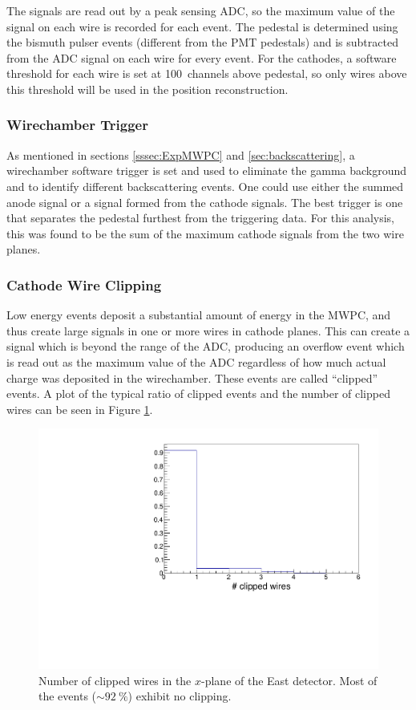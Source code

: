 The signals are read out by a peak sensing ADC, so the maximum value of the signal on each wire
is recorded
for each event. The pedestal is determined using the bismuth pulser events (different from the
PMT pedestals) and is subtracted from the ADC signal on each wire for every event. For the cathodes, a software
threshold for each wire is set at 100~channels above pedestal, so only wires above this threshold
will be used in the position reconstruction.

\subsubsection{Wirechamber Trigger} \label{sssec:mwpctrigg}

As mentioned in sections \ref{sssec:ExpMWPC} and \ref{sec:backscattering}, a wirechamber
software trigger is set and used to eliminate the gamma background and to identify different
backscattering events. One could use either the summed anode signal or a signal formed from
the cathode signals. The best trigger is one that separates the pedestal furthest from the
triggering data. For this analysis, this was found to be the sum of the maximum cathode
signals from the two wire planes.

\subsubsection{Cathode Wire Clipping}

Low energy events deposit a substantial amount of energy in the MWPC, and thus create large
signals in one or more wires in cathode planes. This can create a signal which is beyond the
range of the ADC, producing an overflow event which is read out as the maximum value of the ADC
regardless of how much actual charge was deposited in the wirechamber.
These events are called ``clipped'' events. A plot of the typical ratio of clipped events and the
number of clipped wires can be seen in Figure \ref{fig:nClipped}.

\begin{figure}[h]
  \centering
  \includegraphics[scale=0.6,page=1]{4-UCNACalibrations/mwpc_position.pdf} 
  \caption{Number of clipped wires in the $x$-plane of the East detector. Most of the events
    ($\sim92~\%$) exhibit no clipping.}
  \label{fig:nClipped}
\end{figure}


